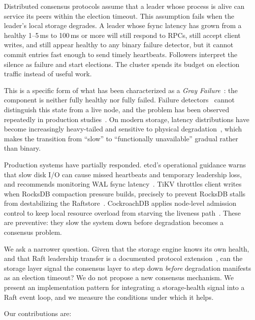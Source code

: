\documentclass[conference, a4paper]{IEEEtran}
\begin{document}
Distributed consensus protocols assume that a leader whose process is
alive can service its peers within the election timeout. This assumption
fails when the leader's local storage degrades. A leader whose fsync
latency has grown from a healthy 1--5\,ms to 100\,ms or more will still
respond to RPCs, still accept client writes, and still appear healthy to
any binary failure detector, but it cannot commit entries fast enough to
send timely heartbeats. Followers interpret the silence as failure and
start elections. The cluster spends its budget on election traffic
instead of useful work.

This is a specific form of what has been characterized as a
\emph{Gray Failure}~\cite{gray_failures}: the component is neither fully
healthy nor fully failed. Failure detectors~\cite{chandra_toueg,das_phi}
cannot distinguish this state from a live node, and the problem has been
observed repeatedly in production
studies~\cite{gunawi_bugs,gunawi_stop,alquraan_partition}. On modern
storage, latency distributions have become increasingly heavy-tailed
and sensitive to physical degradation~\cite{hao_tail,narayanan_ssd},
which makes the transition from ``slow'' to ``functionally unavailable''
gradual rather than binary.

Production systems have partially responded. etcd's operational guidance
warns that slow disk I/O can cause missed heartbeats and temporary
leadership loss, and recommends monitoring WAL fsync
latency~\cite{etcd_docs}. TiKV throttles client writes when RocksDB
compaction pressure builds, precisely to prevent RocksDB stalls from
destabilizing the Raftstore~\cite{tikv_docs}. CockroachDB applies
node-level admission control to keep local resource overload from
starving the liveness path~\cite{cockroachdb_taft}. These are
preventive: they slow the system down before degradation becomes a
consensus problem.

We ask a narrower question. Given that the storage engine knows its own
health, and that Raft leadership transfer is a documented protocol
extension~\cite{raft_dissertation,hashicorp_raft}, can the storage
layer signal the consensus layer to step down \emph{before} degradation
manifests as an election timeout? We do not propose a new consensus
mechanism. We present an implementation pattern for integrating a
storage-health signal into a Raft event loop, and we measure the
conditions under which it helps.

Our contributions are:
\end{document}
